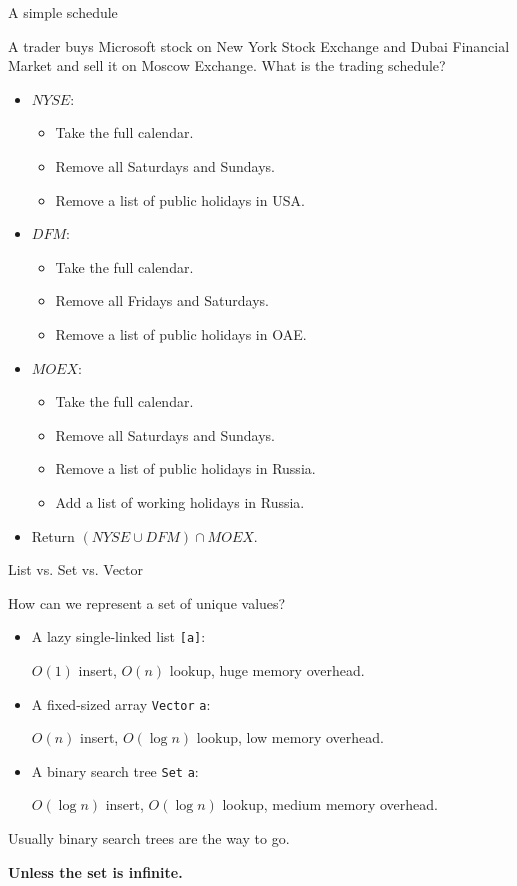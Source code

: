 \documentclass[handout]{beamer}
\begin{document}
\begin{frame}{A simple schedule}

A trader buys Microsoft stock on New York Stock Exchange
and Dubai Financial Market
and sell it on Moscow Exchange. What is the trading schedule?

\pause
\begin{itemize}
\item
$NYSE$:
  \begin{itemize}
  \item
  Take the full calendar.
  \item
  Remove all Saturdays and Sundays.
  \item
  Remove a list of public holidays in USA.
  \end{itemize}
\pause
\item
$DFM$:
  \begin{itemize}
  \item
  Take the full calendar.
  \item
  Remove all Fridays and Saturdays.
  \item
  Remove a list of public holidays in OAE.
  \end{itemize}
\pause
\item
$MOEX$:
  \begin{itemize}
  \item
  Take the full calendar.
  \item
  Remove all Saturdays and Sundays.
  \item
  Remove a list of public holidays in Russia.
  \item
  Add a list of working holidays in Russia.
  \end{itemize}
\pause
\item
Return $(NYSE \cup DFM) \cap MOEX$.
\end{itemize}


\end{frame}

\begin{frame}{List vs. Set vs. Vector}

How can we represent a set of unique values?

\begin{itemize}
\pause
\item A lazy single-linked list {\tt [a]}: \par
      $O(1)$ insert, $O(n)$ lookup, huge memory overhead.

\pause
\item A fixed-sized array {\tt Vector} {\tt a}: \par
      $O(n)$ insert, $O(\log n)$ lookup, low memory overhead.

\pause
\item A binary search tree {\tt Set} {\tt a}: \par
      $O(\log n)$ insert, $O(\log n)$ lookup, medium memory overhead.
\end{itemize}

\pause
Usually binary search trees are the way to go.

\bigskip

\pause
{\bf Unless the set is infinite.}

\end{frame}
\end{document}
